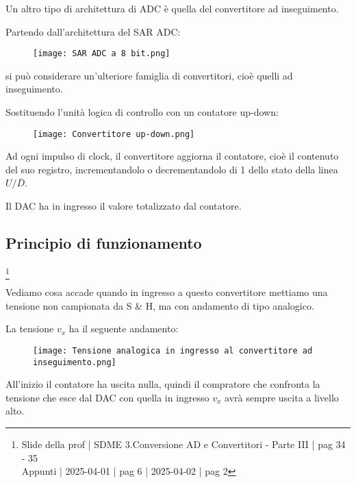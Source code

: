 Un altro tipo di architettura di ADC è quella del convertitore ad inseguimento. \newline 

Partendo dall'architettura del SAR ADC: 

\begin{figure}[h]
    \centering
    \texttt{[image: SAR ADC a 8 bit.png]}
\end{figure}

si può considerare un'ulteriore famiglia di convertitori, cioè quelli ad inseguimento. \newline 

Sostituendo l'unità logica di controllo con un contatore up-down: 

\begin{figure}[h]
    \centering
    \texttt{[image: Convertitore up-down.png]}
\end{figure}

Ad ogni impulso di clock, il convertitore aggiorna il contatore, cioè il contenuto del suo registro, 
incrementandolo o decrementandolo di 1 dello stato della linea $U / \overline{D}$. \newline 

Il DAC ha in ingresso il valore totalizzato dal contatore. \newline 

\newpage 

\subsection{Principio di funzionamento}
\footnote{Slide della prof | SDME 3.Conversione AD e Convertitori - Parte III | pag 34 - 35 \\  
Appunti | 2025-04-01 | pag 6 | 2025-04-02 | pag 2 }

Vediamo cosa accade quando in ingresso a questo convertitore mettiamo una tensione non campionata da S \& H, ma con andamento di tipo analogico. \newline 

La tensione $v_x$ ha il seguente andamento: 

\begin{figure}[h]
    \centering
    \texttt{[image: Tensione analogica in ingresso al convertitore ad inseguimento.png]}
\end{figure}

All'inizio il contatore ha uscita nulla, quindi il compratore che confronta la tensione che esce dal DAC con quella in ingresso $v_x$ 
avrà sempre uscita a livello alto. \newline 

